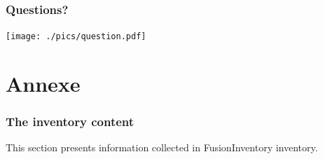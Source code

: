 \documentclass{beamer}
\begin{document}
\begin{frame}
    \frametitle{Questions?}

    \begin{center}

    \texttt{[image: ./pics/question.pdf]}

    \end{center}

\end{frame}


\section{Annexe}
\begin{frame}

    \frametitle{The inventory content}

This section presents information collected in FusionInventory inventory.

\end{frame}
\end{document}
